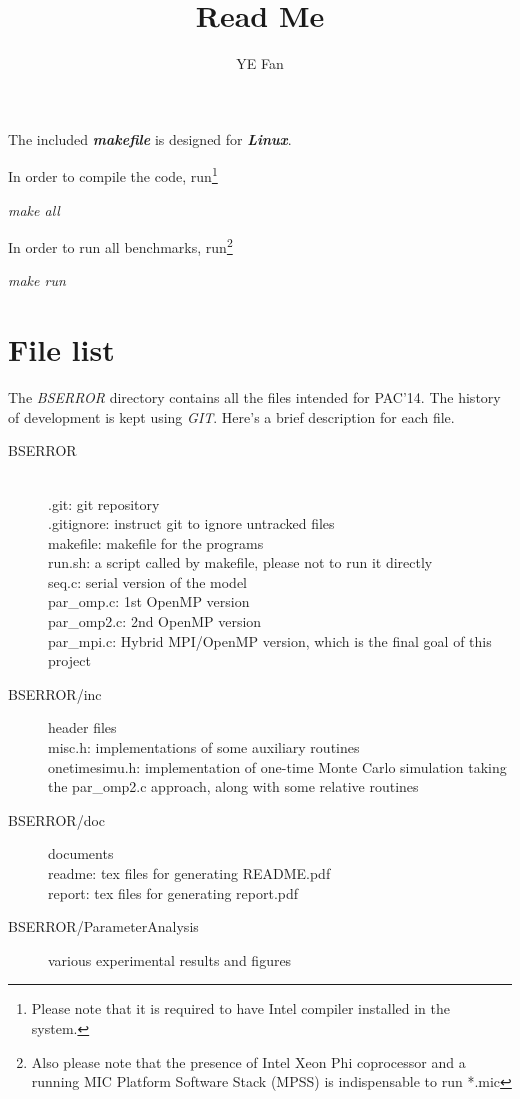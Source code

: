 \documentclass{article}
\begin{document}
\title{\textbf{Read Me}}
\author{YE Fan}

\maketitle

The included \emph{\textbf{makefile}} is designed for \emph{\textbf{Linux}}. 

In order to compile the code, run\footnote{Please note that it is required to have Intel compiler installed in the system.}

\begin{center}
  \emph{make all}
\end{center}

In order to run all benchmarks, run\footnote{Also please note that the presence of Intel Xeon Phi coprocessor and a running MIC Platform Software Stack (MPSS) is indispensable to run *.mic}

\begin{center}
  \emph{make run}
\end{center}

\section*{File list}
The \emph{BSERROR} directory contains all the files intended for PAC'14. The history of development is kept using \emph{GIT}. Here's a brief description for each file.

\begin{description}
\item[BSERROR] \hfill\\
  .git: git repository\\
  .gitignore: instruct git to ignore untracked files\\
  makefile: makefile for the programs\\
  run.sh: a script called by makefile, please not to run it directly\\
  seq.c: serial version of the model\\
  par\_omp.c: 1st OpenMP version\\
  par\_omp2.c: 2nd OpenMP version\\
  par\_mpi.c: Hybrid MPI/OpenMP version, which is the final goal of this project\\
  
\item[BSERROR/inc] header files\\
  misc.h: implementations of some auxiliary routines\\
  onetimesimu.h: implementation of one-time Monte Carlo simulation taking the par\_omp2.c approach, along with some relative routines\\
\item[BSERROR/doc] documents\\
  readme: tex files for generating README.pdf\\
  report: tex files for generating report.pdf\\
\item[BSERROR/ParameterAnalysis] various experimental results and figures\\
\end{description}
\end{document}
